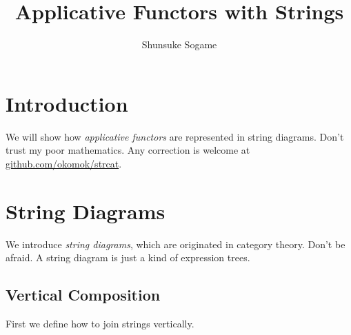 \documentclass{article}
\title{Applicative Functors with Strings}
\author{Shunsuke Sogame}
\begin{document}
\maketitle


\section{Introduction}

We will show how \emph{applicative functors} are represented in string diagrams. %
Don't trust my poor mathematics. Any correction is welcome at %
\href{https://github.com/okomok/strcat}{github.com/okomok/strcat}.  


\section{String Diagrams}

We introduce \emph{string diagrams}, which are originated in category theory. %
Don't be afraid. A string diagram is just a kind of expression trees.

\subsection{Vertical Composition}

First we define how to join strings vertically.




\end{document}
